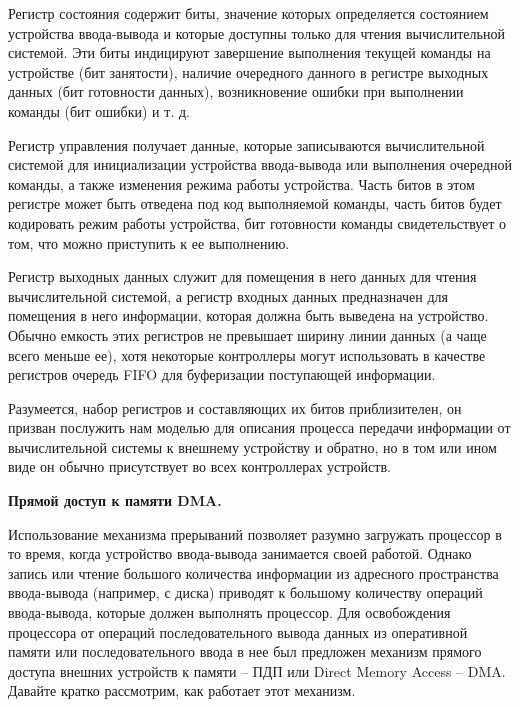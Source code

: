 Регистр состояния содержит биты, значение которых определяется состоянием устройства ввода-вывода и которые доступны только для чтения вычислительной системой. Эти биты индицируют завершение выполнения текущей команды на устройстве (бит занятости), наличие очередного данного в регистре выходных данных (бит готовности данных), возникновение ошибки при выполнении команды (бит ошибки) и т. д.

Регистр управления получает данные, которые записываются вычислительной системой для инициализации устройства ввода-вывода или выполнения очередной команды, а также изменения режима работы устройства. Часть битов в этом регистре может быть отведена под код выполняемой команды, часть битов будет кодировать режим работы устройства, бит готовности команды свидетельствует о том, что можно приступить к ее выполнению.

Регистр выходных данных служит для помещения в него данных для чтения вычислительной системой, а регистр входных данных предназначен для помещения в него информации, которая должна быть выведена на устройство. Обычно емкость этих регистров не превышает ширину линии данных (а чаще всего меньше ее), хотя некоторые контроллеры могут использовать в качестве регистров очередь FIFO для буферизации поступающей информации.

Разумеется, набор регистров и составляющих их битов приблизителен, он призван послужить нам моделью для описания процесса передачи информации от вычислительной системы к внешнему устройству и обратно, но в том или ином виде он обычно присутствует во всех контроллерах устройств.

\begin{center}{\bfseries Прямой доступ к памяти DMA.}
\end{center}

Использование механизма прерываний позволяет разумно загружать процессор в то время, когда устройство ввода-вывода занимается своей работой. Однако запись или чтение большого количества информации из адресного пространства ввода-вывода (например, с диска) приводят к большому количеству операций ввода-вывода, которые должен выполнять процессор. Для освобождения процессора от операций последовательного вывода данных из оперативной памяти или последовательного ввода в нее был предложен механизм прямого доступа внешних устройств к памяти – ПДП или Direct Memory Access – DMA. Давайте кратко рассмотрим, как работает этот механизм.

